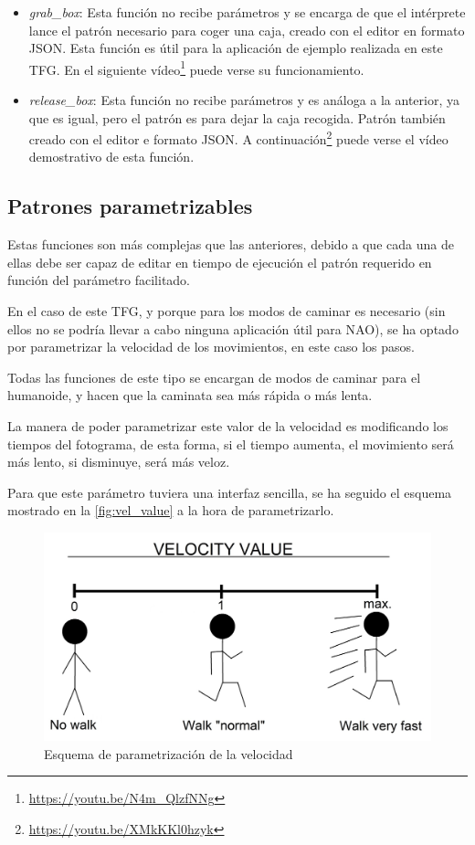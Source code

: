 \begin{itemize}
    \item \textit{grab\_box}: Esta función no recibe parámetros y se encarga de que el intérprete lance el patrón necesario para coger una caja, creado con el editor en formato JSON. Esta función es útil para la aplicación de ejemplo realizada en este TFG. En el siguiente vídeo\footnote{\url{https://youtu.be/N4m_QlzfNNg}} puede verse su funcionamiento.
    \item \textit{release\_box}: Esta función no recibe parámetros y es análoga a la anterior, ya que es igual, pero el patrón es para dejar la caja recogida. Patrón también creado con el editor e formato JSON. A continuación\footnote{\url{https://youtu.be/XMkKKl0hzyk}} puede verse el vídeo demostrativo de esta función.
\end{itemize}

\subsection{Patrones parametrizables}

Estas funciones son más complejas que las anteriores, debido a que cada una de ellas debe ser capaz de editar en tiempo de ejecución el patrón requerido en función del parámetro facilitado.

En el caso de este TFG, y porque para los modos de caminar es necesario (sin ellos no se podría llevar a cabo ninguna aplicación útil para NAO), se ha optado por parametrizar la velocidad de los movimientos, en este caso los pasos.

Todas las funciones de este tipo se encargan de modos de caminar para el humanoide, y hacen que la caminata sea más rápida o más lenta.

La manera de poder parametrizar este valor de la velocidad es modificando los tiempos del fotograma, de esta forma, si el tiempo aumenta, el movimiento será más lento, si disminuye, será más veloz.

Para que este parámetro tuviera una interfaz sencilla, se ha seguido el esquema mostrado en la \autoref{fig:vel_value} a la hora de parametrizarlo.

\begin{figure}[H]
  \centering
  \includegraphics[width=1\textwidth]{figures/cap_4/velocity_value.jpeg}
  \caption{Esquema de parametrización de la velocidad}
  \label{fig:vel_value}
\end{figure}

